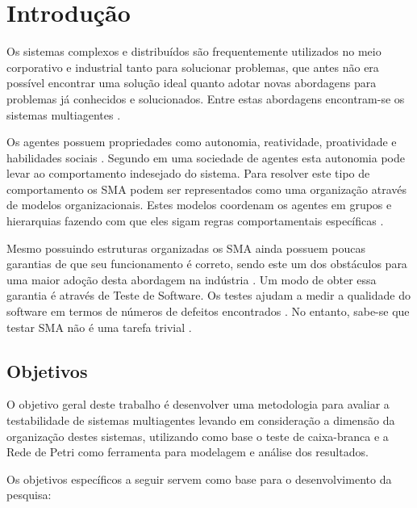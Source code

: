\tableofcontents

\chapter{Introdução}
  
Os sistemas complexos e distribuídos são frequentemente utilizados no meio corporativo e industrial tanto para solucionar problemas, que antes não era possível encontrar uma solução ideal quanto adotar novas abordagens para problemas já conhecidos e solucionados. Entre estas abordagens encontram-se os sistemas multiagentes \cite{benfield2006making}.

Os agentes possuem propriedades como autonomia, reatividade, proatividade e habilidades sociais \cite{jennings2000agent}. Segundo \citet{hubner2007developing} em uma sociedade de agentes esta autonomia pode levar ao comportamento indesejado do sistema. Para resolver este tipo de comportamento os SMA podem ser representados como uma organização através de modelos organizacionais. Estes modelos coordenam os agentes em grupos e hierarquias fazendo com que eles sigam regras comportamentais específicas \cite{van2005formal, argente2006multi}.

Mesmo possuindo estruturas organizadas os SMA ainda possuem poucas garantias de que seu funcionamento é correto, sendo este um dos obstáculos para uma maior adoção desta abordagem na indústria \cite{houhamdi2011multi,winikoff2010assurance}. Um modo de obter essa garantia é através de Teste de Software. Os testes ajudam a medir a qualidade do software em termos de números de defeitos encontrados \cite{graham2008foundations}. No entanto, sabe-se que testar SMA não é uma tarefa trivial \cite{winikoff2010assurance}.


\section{Objetivos}

O objetivo geral deste trabalho é desenvolver uma metodologia para avaliar a testabilidade de sistemas multiagentes levando em consideração a dimensão da organização destes sistemas, utilizando como base o teste de caixa-branca e a Rede de Petri como ferramenta para modelagem e análise dos resultados.

Os objetivos específicos a seguir servem como base para o desenvolvimento da pesquisa:

